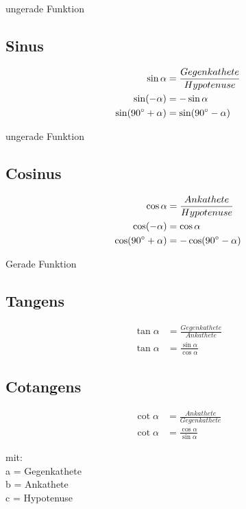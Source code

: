 \begin{sectionbox}
	ungerade Funktion
	
	
	
	
	
	\subsection{Sinus}
		\begin{emphbox}
			\begin{align*}
			 \sin \alpha &= \frac{Gegenkathete}{Hypotenuse} \\
			 \sin (-\alpha) &= -\sin \alpha \\
			 \sin (90 \degree + \alpha) &= \sin (90 \degree - \alpha)
			\end{align*}
		\end{emphbox}
		ungerade Funktion
	\subsection{Cosinus}
		\begin{emphbox}
			\begin{align*}
			\cos \alpha &= \frac{Ankathete}{Hypotenuse}\\
			\cos (-\alpha) &= \cos \alpha\\
			\cos (90 \degree + \alpha) &= -\cos (90 \degree - \alpha)
			\end{align*}
		\end{emphbox}
		Gerade Funktion

	\subsection{Tangens}
		\begin{emphbox}
			\begin{align*}
			\tan \alpha &= \frac{Gegenkathete}{Ankathete} \\
			\tan \alpha &= \frac{\sin \alpha}{\cos \alpha} 
			\end{align*}
		\end{emphbox}
		
	\subsection{Cotangens}
		\begin{emphbox}
			\begin{align*}
			\cot \alpha &= \frac{Ankathete}{Gegenkathete} \\
			\cot \alpha &= \frac{\cos \alpha}{\sin \alpha} 		
			\end{align*}
		\end{emphbox}
	mit:\\
	a = Gegenkathete\\
	b = Ankathete\\
	c = Hypotenuse


\end{sectionbox}
